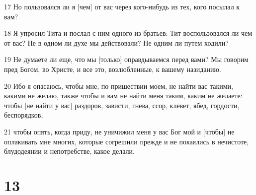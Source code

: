 \par 17 Но пользовался ли я [чем] от вас через кого-нибудь из тех, кого посылал к вам?
\par 18 Я упросил Тита и послал с ним одного из братьев: Тит воспользовался ли чем от вас? Не в одном ли духе мы действовали? Не одним ли путем ходили?
\par 19 Не думаете ли еще, что мы [только] оправдываемся перед вами? Мы говорим пред Богом, во Христе, и все это, возлюбленные, к вашему назиданию.
\par 20 Ибо я опасаюсь, чтобы мне, по пришествии моем, не найти вас такими, какими не желаю, также чтобы и вам не найти меня таким, каким не желаете: чтобы [не найти у вас] раздоров, зависти, гнева, ссор, клевет, ябед, гордости, беспорядков,
\par 21 чтобы опять, когда приду, не уничижил меня у вас Бог мой и [чтобы] не оплакивать мне многих, которые согрешили прежде и не покаялись в нечистоте, блудодеянии и непотребстве, какое делали.

\chapter{13}

